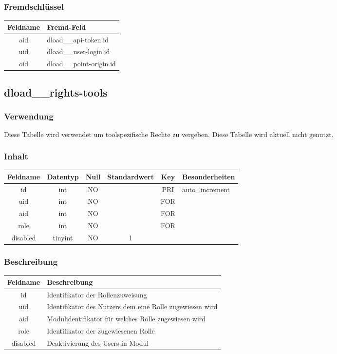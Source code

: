 \subsubsection{Fremdschlüssel}
\begin{table}[H]
	\begin{tabular}{|c|p{12.5cm}|}
		\hline
		\textbf{Feldname} & \textbf{Fremd-Feld} \\ \hline
		aid & dload\_\_api-token.id \\ \hline
		uid & dload\_\_user-login.id \\ \hline
		oid & dload\_\_point-origin.id \\ \hline
	\end{tabular}
\end{table}
\subsection{dload\_\_rights-tools}
\subsubsection{Verwendung} Diese Tabelle wird verwendet um toolspezifische Rechte zu vergeben. Diese Tabelle wird aktuell nicht genutzt.
\subsubsection{Inhalt}
\begin{table}[H]
	\begin{tabular}{|c|c|c|c|c|p{3.5cm}|}
		\hline
		\textbf{Feldname} & \textbf{Datentyp} & \textbf{Null} & \textbf{Standardwert} & \textbf{Key}   & \textbf{Besonderheiten} \\ \hline
		id & int & NO &  & PRI & auto\_increment \\ \hline
		uid & int & NO &  & FOR & \\ \hline
		aid & int & NO &  & FOR & \\ \hline
		role & int & NO &  & FOR & \\ \hline
		disabled & tinyint & NO & 1 &  & \\ \hline
	\end{tabular}
\end{table}
\subsubsection{Beschreibung}
\begin{table}[H]
	\begin{tabular}{|c|p{12cm}|}
		\hline
		\textbf{Feldname} & \textbf{Beschreibung} \\ \hline
		id & Identifikator der Rollenzuweisung \\ \hline
		uid & Identifikator des Nutzers dem eine Rolle zugewiesen wird \\ \hline
		aid & Modulidentifikator für welches Rolle zugewiesen wird \\ \hline
		role & Identifikator der zugewiesenen Rolle \\ \hline
		disabled & Deaktivierung des Users in Modul \\ \hline
	\end{tabular}
\end{table}
